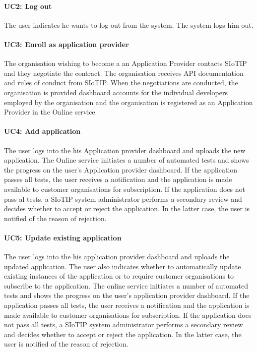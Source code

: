 \documentclass[english]{sareport}
\begin{document}
\paragraph{UC2: Log out}
The user indicates he wants to log out from the system.
The system logs him out.

\paragraph{UC3: Enroll as application provider}
The organisation wishing to become a an Application Provider contacts SIoTIP and they negotiate the contract. The organisation receives API documentation and rules of conduct from SIoTIP. When the negotiations are conducted, the organisation is provided dashboard accounts for the individual developers employed by the organisation and the organisation is registered as an Application Provider in the Online service.

\paragraph{UC4: Add application}
The user logs into the his Application provider dashboard and uploads the new application. The Online service initiates a number of automated tests and shows the progress on the user's Application provider dashboard. If the application passes all tests, the user receives a notification and the application is made available to customer organisations for subscription. If the application does not pass al tests, a SIoTIP system administrator performs a secondary review and decides whether to accept or reject the application. In the latter case, the user is notified of the reason of rejection.

\paragraph{UC5: Update existing application}
The user logs into the his application provider dashboard and uploads the updated application. The user also indicates whether to automatically update existing instances of the application or to require customer organisations to subscribe to the application. The online service initiates a number of automated tests and shows the progress on the user's application provider dashboard. If the application passes all tests, the user receives a notification and the application is made available to customer organisations for subscription. If the application does not pass all tests, a SIoTIP system administrator performs a secondary review and decides whether to accept or reject the application. In the latter case, the user is notified of the reason of rejection.
\end{document}
